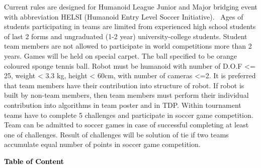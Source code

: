 \documentclass[a4paper]{article}
\begin{document}
Current rules are designed for Humanoid League Junior and Major bridging event with abbreviation HELSI (Humanoid Entry
Level Soccer Initiative). \ Ages of students participating in teams are limited from experienced high school students
of last 2 forms and ungraduated (1-2 year) university-college students. Student team members are not allowed to
participate in world competitions more than 2 years. Games will be held on special carpet. The ball specified to be
orange coloured sponge tennis ball. Robot must be humanoid with number of D.O.F {\textless}= 25, weight {\textless} 3.3
kg, height {\textless} 60cm, with number of cameras {\textless}=2. It is preferred that team members have their
contribution into structure of robot. If robot is built by non-team members, then team members must perform their
individual contribution into algorithms in team poster and in TDP. Within tournament teams have to complete 5
challenges and participate in soccer game competition. Team can be admitted to soccer games in case of successful
completing at least one of challenges. Result of challenges will be solution of tie if two teams accumulate equal
number of points in soccer game competition. 


\bigskip

\textbf{\textcolor{black}{Table of Content}}
\end{document}
